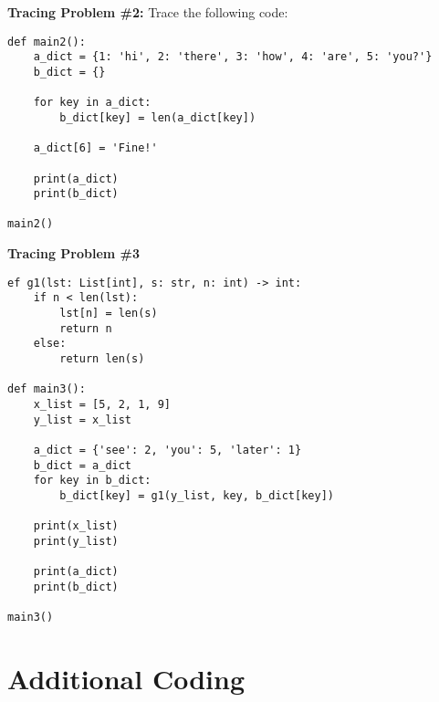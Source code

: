 \documentclass{article}
\begin{document}
\textbf{Tracing Problem \#2:}  Trace the following code:

\vspace{0.15in}

\begin{verbatim}
def main2():
    a_dict = {1: 'hi', 2: 'there', 3: 'how', 4: 'are', 5: 'you?'}
    b_dict = {}

    for key in a_dict:
        b_dict[key] = len(a_dict[key])

    a_dict[6] = 'Fine!'

    print(a_dict)
    print(b_dict)

main2()
\end{verbatim}

\newpage

\textbf{Tracing Problem \#3}
\begin{verbatim}
ef g1(lst: List[int], s: str, n: int) -> int:
    if n < len(lst):
        lst[n] = len(s)
        return n
    else:
        return len(s)

def main3():
    x_list = [5, 2, 1, 9]
    y_list = x_list

    a_dict = {'see': 2, 'you': 5, 'later': 1}
    b_dict = a_dict
    for key in b_dict:
        b_dict[key] = g1(y_list, key, b_dict[key])

    print(x_list)
    print(y_list)

    print(a_dict)
    print(b_dict)

main3()

\end{verbatim}

\vspace{0.15in}

\section*{Additional Coding}
\end{document}
